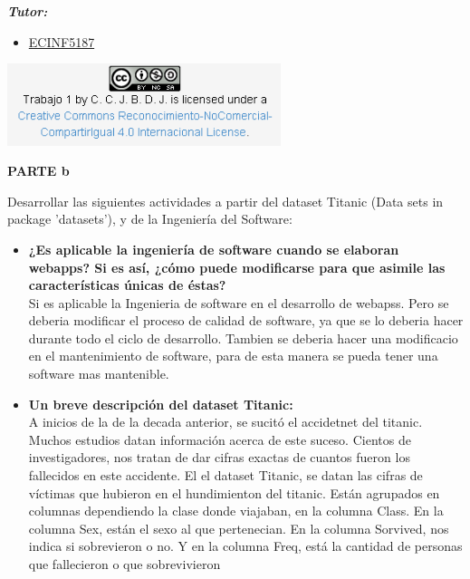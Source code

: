 \documentclass[a4paper,openright,12pt]{report}
\begin{document}
{\begin{flushleft}
\textit{\textbf{Tutor:}}
\begin{itemize}
\renewcommand{\labelitemi}{$\diamond$} 
\item \href{http://www.iralis.org/?q=node%2F10&paso=10&letra=O&id=4796}{ECINF5187}
\end{itemize}
\begin{center}\href{http://creativecommons.org/choose/}{\includegraphics[width=8cm]{Licencia}}\end{center} 
\bigskip
\bigskip
\end{flushleft}
\thinspace
\bigskip

\newpage
\begin{center}
\begin{Huge}
\textbf {PARTE b}\\
\end{Huge}
\end{center}
Desarrollar las siguientes actividades a partir del dataset Titanic (Data sets in package 'datasets'), y de la Ingeniería del Software:\\

\begin{itemize}
\item \textbf{¿Es aplicable la ingeniería de software cuando se elaboran webapps? Si es así, ¿cómo puede modificarse para que asimile las características únicas de éstas?}\\

Si es aplicable la Ingenieria de software en el desarrollo de webapss. Pero se deberia modificar el proceso de calidad de software, ya que se lo deberia hacer durante todo el ciclo de desarrollo. Tambien se deberia hacer una modificacio en el mantenimiento de software, para de esta manera se pueda tener una software mas mantenible.

\item \textbf{Un breve descripción del dataset Titanic:}\\

A inicios de la de la decada anterior, se sucitó el accidetnet del titanic. Muchos estudios datan información acerca de este suceso. Cientos de investigadores, nos tratan de dar cifras exactas de cuantos fueron los fallecidos en este accidente.
El el dataset Titanic, se datan las cifras de víctimas que hubieron en el hundimienton del titanic. Están agrupados en columnas dependiendo la clase donde viajaban, en la columna Class. En la columna Sex, están el sexo al que pertenecian. En la columna Sorvived, nos indica si sobrevieron o no. Y en la columna Freq, está la cantidad de personas que fallecieron o que sobrevivieron


\end{itemize}}
\end{document}
